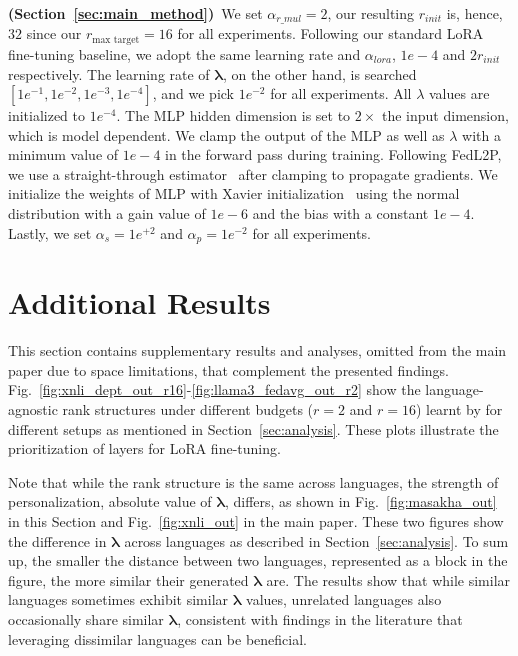 \noindent\textbf{\method{} (Section~\ref{sec:main_method})}~We set $\alpha_{r\_mul}=2$, our resulting $r_{init}$ is, hence, $32$ since our $r_{\text{max target}}=16$ for all experiments. Following our standard LoRA fine-tuning baseline, we adopt the same learning rate and $\alpha_{lora}$, $1e-4$ and $2r_{init}$ respectively. The learning rate of $\bm{\lambda}$, on the other hand, is searched $[1e^{-1},1e^{-2},1e^{-3},1e^{-4}]$, and we pick $1e^{-2}$ for all experiments.
All $\lambda$ values are initialized to $1e^{-4}$. The MLP hidden dimension is set to $2\times$ the input dimension, which is model dependent. We clamp the output of the MLP as well as $\lambda$ with a minimum value of $1e-4$ in the forward pass during training. Following FedL2P, we use a straight-through estimator~\cite{bengio2013estimating} after clamping to propagate gradients. We initialize the weights of MLP with Xavier initialization~\cite{glorot2010understanding} using the normal distribution with a gain value of $1e-6$ and the bias with a constant $1e-4$. Lastly, we set $\alpha_s=1e^{+2}$ and $\alpha_p=1e^{-2}$ for all experiments.


\section{Additional Results}

This section contains supplementary results and analyses, omitted from the main paper due to space limitations, that complement the presented findings.
Fig.~\ref{fig:xnli_dept_out_r16}-\ref{fig:llama3_fedavg_out_r2} show the language-agnostic rank structures under different budgets ($r=2$ and $r=16$) learnt by \method{} for different setups as mentioned in Section~\ref{sec:analysis}. These plots illustrate the prioritization of layers for LoRA fine-tuning. 

Note that while the rank structure is the same across languages, the strength of personalization, absolute value of $\bm{\lambda}$, differs, as shown in Fig.~\ref{fig:masakha_out} in this Section and Fig.~\ref{fig:xnli_out} in the main paper. These two figures show the difference in $\bm{\lambda}$ across languages as described in Section~\ref{sec:analysis}. To sum up, the smaller the distance between two languages, represented as a block in the figure, the more similar their generated $\bm{\lambda}$ are. The results show that while similar languages sometimes exhibit similar $\bm{\lambda}$ values, unrelated languages also occasionally share similar $\bm{\lambda}$, consistent with findings in the literature that leveraging dissimilar languages can be beneficial.

